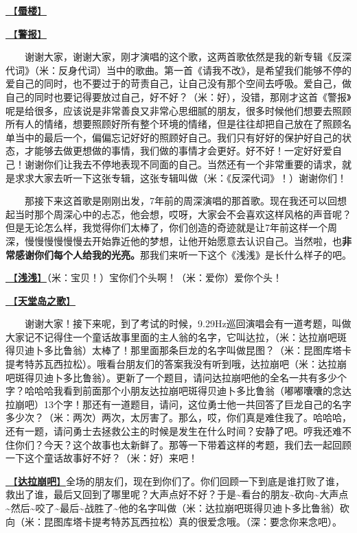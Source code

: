 \documentclass[]{ctexbook}
\begin{document}
\hyperref[mirage]{🎵【\textbf{蜃楼}】}

\hyperref[the-giver]{🎵【\textbf{警报}】}

  谢谢大家，谢谢大家，刚才演唱的这个歌，这两首歌依然是我的新专辑《反深代词》（米：反身代词）当中的歌曲。第一首《请我不改》，是希望我们能够不停的爱自己的同时，也不要过于的苛责自己，让自己没有那个空间去呼吸。爱自己，做自己的同时也要记得要放过自己，好不好？（米：好），没错，那刚才这首《警报》呢是给很多，应该说是非常善良又非常心思细腻的朋友，很多时候他们想要去照顾所有人的情绪，想要照顾好所有整个环境的情绪，但是往往却把自己放在了照顾名单当中的最后一个，偏偏忘记好好的照顾好自己。我们只有好好的保护好自己的状态，才能够去做更想做的事情，我们做的事情才会更好。好不好！一定好好爱自己！谢谢你们让我去不停地表现不同面的自己。当然还有一个非常重要的请求，就是求求大家去听一下这张专辑，这张专辑叫做（米：《反深代词》！）谢谢你们！

  那接下来这首歌是刚刚出发，7年前的周深演唱的那首歌。现在我还可以回想起当时那个周深心中的忐忑，他会想，哎呀，大家会不会喜欢这样风格的声音呢？但是无论怎么样，我觉得你们太棒了，你们创造的奇迹就是让7年前这样一个周深，慢慢慢慢慢慢去开始靠近他的梦想，让他开始愿意去认识自己。当然啦，也\textbf{非常感谢你们每个人给我的光亮。}那我们来听一下这个《浅浅》是长什么样子的吧。

\hyperref[qianqian]{🎵【\textbf{浅浅}】}（米：宝贝！）宝你们个头啊！（米：爱你）爱你个头！

\hyperref[haven-song]{🎵【\textbf{天堂岛之歌}】}

  谢谢大家！接下来呢，到了考试的时候，9.29Hz巡回演唱会有一道考题，叫做大家记不记得住一个童话故事里面的主人翁的名字，它叫达拉，（米：达拉崩吧斑得贝迪卜多比鲁翁）太棒了！那里面那条巨龙的名字叫做昆图？（米：昆图库塔卡提考特苏瓦西拉松）。哦看台朋友们的答案我没有听到哦，达拉崩吧（米：达拉崩吧斑得贝迪卜多比鲁翁）。更新了一个题目，请问达拉崩吧他的全名一共有多少个字？哈哈哈我看到前面那个小朋友达拉崩吧斑得贝迪卜多比鲁翁（嘟嘟囔囔的念达拉崩吧）13个字！那还有一道题目，请问，这位勇士他一共回答了巨龙自己的名字多少次？（米：两次）两次，太厉害了。那么，哎，你们真是难住我了。哈哈哈，还有一题，请问勇士去拯救公主的时候是发生在什么时间？安静了吧。哼我还难不住你们？今天？这个故事也太新鲜了。那等一下带着这样的考题，我们去一起回顾一下这个童话故事好不好？（米：好）来吧！

\hyperref[dalabengba]{🎵【\textbf{达拉崩吧}】}全场的朋友们，现在到你们了。你们回顾一下到底是谁打败了谁，救出了谁，最后又回到了哪里呢？大声点好不好？于是\textasciitilde 看台的朋友\textasciitilde 砍向\textasciitilde 大声点\textasciitilde 然后\textasciitilde 咬了\textasciitilde 最后\textasciitilde 战胜了\textasciitilde 他的名字叫做（米：达拉崩吧斑得贝迪卜多比鲁翁）砍向（米：昆图库塔卡提考特苏瓦西拉松）真的很爱念哦。（深：要念你来念吧）。
\end{document}
